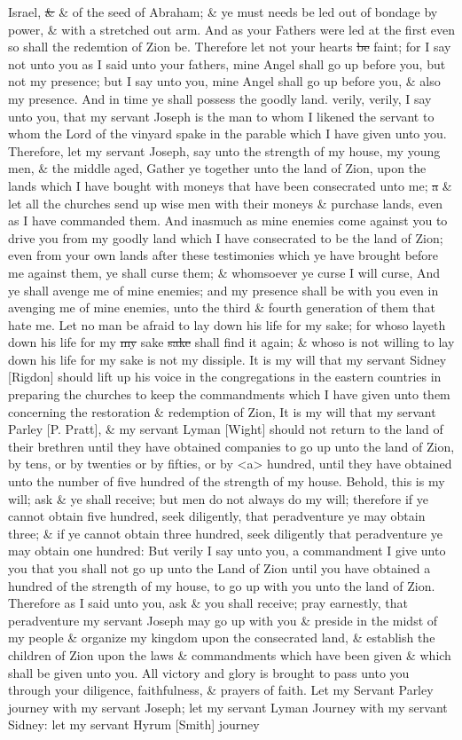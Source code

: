 Israel, \sout{\&} \& of the seed of Abraham; \& ye must needs be led out of bondage by power, \& with a stretched out arm. And as your Fathers were led at the first even so shall the redemtion of Zion be. Therefore let not your hearts \sout{be} faint; for I say not unto you as I said unto your fathers, mine Angel shall go up before you, but not my presence; but I say unto you, mine Angel shall go up before you, \& also my presence. And in time ye shall possess the goodly land. verily, verily, I say unto you, that my servant Joseph is the man to whom I likened the servant to whom the Lord of the vinyard spake in the parable which I have given unto you. Therefore, let my servant Joseph, say unto the strength of my house, my young men, \& the middle aged, Gather ye together unto the land of Zion, upon the lands which I have bought with moneys that have been consecrated unto me; \sout{a} \& let all the churches send up wise men with their moneys \& purchase lands, even as I have commanded them. And inasmuch as mine enemies come against you to drive you from my goodly land which I have consecrated to be the land of Zion; even from your own lands after these testimonies which ye have brought before me against them, ye shall curse them; \& whomsoever ye curse I will curse, And ye shall avenge me of mine enemies; and my presence shall be with you even in avenging me of mine enemies, unto the third \& fourth generation of them that hate me. Let no man be afraid to lay down his life for my sake; for whoso layeth down his life for my \sout{my} sake \sout{sake} shall find it again; \& whoso is not willing to lay down his life for my sake is not my dissiple. It is my will that my servant Sidney [Rigdon] should lift up his voice in the congregations in the eastern countries in preparing the churches to keep the commandments which I have given unto them concerning the restoration \& redemption of Zion, It is my will that my servant Parley [P. Pratt], \& my servant Lyman [Wight] should not return to the land of their brethren until they have obtained companies to go up unto the land of Zion, by tens, or by twenties or by fifties, or by <a> hundred, until they have obtained unto the number of five hundred of the strength of my house. Behold, this is my will; ask \& ye shall receive; but men do not always do my will; therefore if ye cannot obtain five hundred, seek diligently, that peradventure ye may obtain three; \& if ye cannot obtain three hundred, seek diligently that peradventure ye may obtain one hundred: But verily I say unto you, a commandment I give unto you that you shall not go up unto the Land of Zion until you have obtained a hundred of the strength of my house, to go up with you unto the land of Zion. Therefore as I said unto you, ask \& you shall receive; pray earnestly, that peradventure my servant Joseph may go up with you \& preside in the midst of my people \& organize my kingdom upon the consecrated land, \& establish the children of Zion upon the laws \& commandments which have been given \& which shall be given unto you. All victory and glory is brought to pass unto you through your diligence, faithfulness, \& prayers of faith. Let my Servant Parley journey with my servant Joseph; let my servant Lyman Journey with my servant Sidney: let my servant Hyrum [Smith] journey 